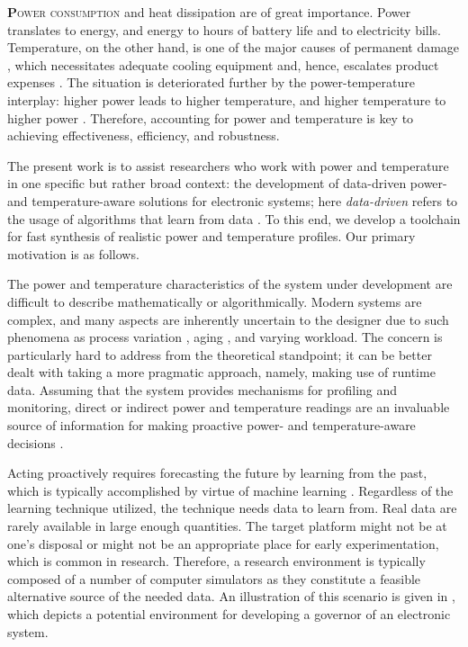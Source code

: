 \lettrine[findent=0.3em, nindent=0em]{\textbf{P}}{ower consumption} and heat
dissipation are of great importance. Power translates to energy, and energy to
hours of battery life and to electricity bills. Temperature, on the other hand,
is one of the major causes of permanent damage \cite{jedec}, which necessitates
adequate cooling equipment and, hence, escalates product expenses
\cite{chaudhry2015}. The situation is deteriorated further by the
power-temperature interplay: higher power leads to higher temperature, and
higher temperature to higher power \cite{liu2007}. Therefore, accounting for
power and temperature is key to achieving effectiveness, efficiency, and
robustness.

The present work is to assist researchers who work with power and temperature in
one specific but rather broad context: the development of data-driven power- and
temperature-aware solutions for electronic systems; here \emph{data-driven}
refers to the usage of algorithms that learn from data \cite{bishop2006}. To
this end, we develop a toolchain for fast synthesis of realistic power and
temperature profiles. Our primary motivation is as follows.

The power and temperature characteristics of the system under development are
difficult to describe mathematically or algorithmically. Modern systems are
complex, and many aspects are inherently uncertain to the designer due to such
phenomena as process variation \cite{chandrakasan2000}, aging \cite{coskun2006},
and varying workload. The concern is particularly hard to address from the
theoretical standpoint; it can be better dealt with taking a more pragmatic
approach, namely, making use of runtime data. Assuming that the system provides
mechanisms for profiling and monitoring, direct or indirect power and
temperature readings are an invaluable source of information for making
proactive power- and temperature-aware decisions \cite{chaudhry2015,
coskun2008}.


Acting proactively requires forecasting the future by learning from the past,
which is typically accomplished by virtue of machine learning \cite{bishop2006}.
Regardless of the learning technique utilized, the technique needs data to learn
from. Real data are rarely available in large enough quantities. The target
platform might not be at one's disposal or might not be an appropriate place for
early experimentation, which is common in research. Therefore, a research
environment is typically composed of a number of computer simulators as they
constitute a feasible alternative source of the needed data. An illustration of
this scenario is given in , which depicts a potential
environment for developing a governor of an electronic system.

